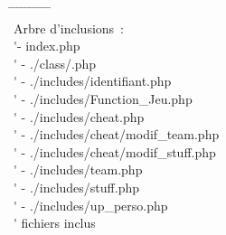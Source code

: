 \documentclass{article}
\begin{document}
\begin{tabbing}
\=\hspace{2mm} \=\hspace{2mm} \=\hspace{2mm} \=\hspace{2mm} \=\hspace{2mm} \=\hspace{2mm} \=\hspace{2mm} \=\hspace{2mm} \=\hspace{2mm} \=\hspace{2mm} \\
Arbre d'inclusions~:\\
\' \>- index.php\\
\' \> \> \vline- ./class/.php\\
\' \> \> \vline- ./includes/identifiant.php\\
\' \> \> \vline- ./includes/Function\_Jeu.php\\
\' \> \> \vline- ./includes/cheat.php\\
\' \> \> \vline \> \vline- ./includes/cheat/modif\_team.php\\
\' \> \> \vline \> \vline- ./includes/cheat/modif\_stuff.php\\
\' \> \> \vline- ./includes/team.php\\
\' \> \> \vline- ./includes/stuff.php\\
\' \> \> \vline- ./includes/up\_perso.php\\
\' \>  fichiers inclus\\

\end{tabbing}
\end{document}

